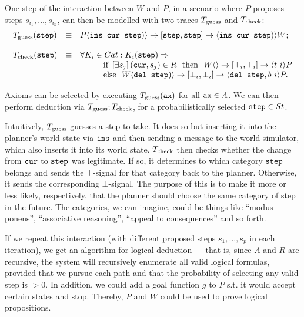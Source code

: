 One step of the interaction between $W$ and $P$, in a scenario where $P$ proposes steps $s_{i_1},\dots,s_{i_n}$, can then be modelled with two traces $T_{\mt{guess}}$ and $T_{\mt{check}}$:
$$
	\begin{array}{l l l}
		T_{\mt{guess}}(\tt{step}) & \equiv & \sendsf{P}{\tt{ins cur step})}{\tt{step}}{\tt{step}}{\tt{ins cur step})}{W};\\
		\\
		T_{\mt{check}}(\tt{step}) & \equiv &
		\forall K_i \in Cat: K_i(\tt{step}) \Rightarrow\\
		
		& & \hspace{1cm} \mt{if } \exQ{s_j} (\field{cur}, s_j) \in R\ \mt{ then } \
					\sendsf{W}{}{\top_i}{\top_i}{t\ i}{P}\\
		& & \hspace{1cm} \mt{else }\ \sendsf{W}{\tt{del step})}{\bot_i}{\bot_i}{\tt{del step}, b\ i}{P}.\\
	\end{array}
$$

\medskip

Axioms can be selected by executing $T_{\mt{guess}}(\tt{ax})$ for all $\tt{ax} \in A$. We can then perform deduction via $T_{\mt{guess}};T_{\mt{check}}$, for a probabilistically selected $\tt{step} \in St$.

Intuitively, $T_{\mt{guess}}$ guesses a step to take. It does so but inserting it into the planner's world-state via $\tt{ins}$ and then sending a message to the world simulator, which also inserts it into its world state. $T_{\mt{check}}$ then checks whether the change from $\tt{cur}$ to $\tt{step}$ was legitimate. If so, it determines to which category $\tt{step}$ belongs and sends the $\top$-signal for that category back to the planner. Otherwise, it sends the corresponding $\bot$-signal. The purpose of this is to make it more or less likely, respectively, that the planner should choose the same category of step in the future. The categories, we can imagine, could be things like ``modus ponens'', ``associative reasoning'', ``appeal to consequences'' and so forth.

If we repeat this interaction (with different proposed steps $s_1,\dots,s_p$ in each iteration), we get an algorithm for logical deduction  --- that is, since $A$ and $R$ are recursive, the system will recursively enumerate all valid logical formulas, provided that we pursue each path and that the probability of selecting any valid step is $> 0$. In addition, we could add a goal function $g$ to $P$ s.t. it would accept certain states and stop. Thereby, $P$ and $W$ could be used to prove logical propositions.


